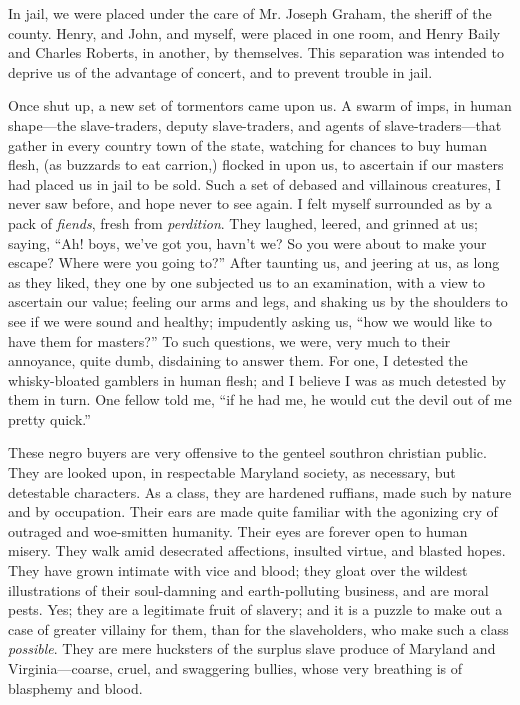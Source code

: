 In jail, we were placed under the care of Mr. Joseph Graham, the sheriff
of the county. Henry, and John, and myself, were placed in one room, and
Henry Baily and Charles Roberts, in another, by themselves. This
separation was intended to deprive us of the advantage of concert, and
to prevent trouble in jail.

Once shut up, a new set of tormentors came upon us. A swarm of imps, in
human shape---the slave-traders, deputy slave-traders, and agents of
slave-traders---that gather in every country town of the state, watching
for chances to buy human flesh, (as buzzards to eat carrion,) flocked in
upon us, to ascertain if our masters had placed us in jail to be sold.
Such a set of debased and villainous creatures, I never saw before, and
hope never to see again. I felt myself surrounded as by a pack of
\emph{fiends}, fresh from \emph{perdition}. They laughed, leered, and
grinned at us; saying, ``Ah! boys, we've got you, havn't we? So you were
about to make your escape? Where were you going to?'' After taunting us,
and jeering at us, {\protect\hypertarget{299}{}{}}as long as they liked,
they one by one subjected us to an examination, with a view to ascertain
our value; feeling our arms and legs, and shaking us by the shoulders to
see if we were sound and healthy; impudently asking us, ``how we would
like to have them for masters?'' To such questions, we were, very much
to their annoyance, quite dumb, disdaining to answer them. For one, I
detested the whisky-bloated gamblers in human flesh; and I believe I was
as much detested by them in turn. One fellow told me, ``if he had me, he
would cut the devil out of me pretty quick.''

These negro buyers are very offensive to the genteel southron christian
public. They are looked upon, in respectable Maryland society, as
necessary, but detestable characters. As a class, they are hardened
ruffians, made such by nature and by occupation. Their ears are made
quite familiar with the agonizing cry of outraged and woe-smitten
humanity. Their eyes are forever open to human misery. They walk amid
desecrated affections, insulted virtue, and blasted hopes. They have
grown intimate with vice and blood; they gloat over the wildest
illustrations of their soul-damning and earth-polluting business, and
are moral pests. Yes; they are a legitimate fruit of slavery; and it is
a puzzle to make out a case of greater villainy for them, than for the
slaveholders, who make such a class \emph{possible}. They are mere
hucksters of the surplus slave produce of Maryland and
Virginia---coarse, cruel, and swaggering bullies, whose very breathing
is of blasphemy and blood.

